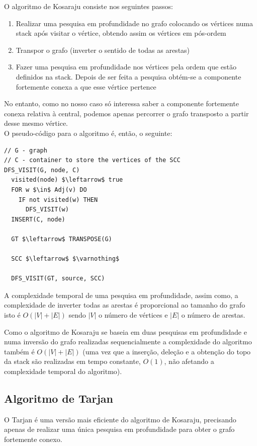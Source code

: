 \documentclass[article, a4paper, 12pt, oneside]{memoir}
\begin{document}
O algoritmo de Kosaraju consiste nos seguintes passos:
\begin{enumerate}
	\item Realizar uma pesquisa em profundidade no grafo colocando os vértices numa stack após visitar o vértice, obtendo assim os vértices em pós-ordem
	\item Transpor o grafo (inverter o sentido de todas as arestas)
	\item Fazer uma pesquisa em profundidade nos vértices pela ordem que estão definidos na stack. Depois de ser feita a pesquisa obtém-se a componente fortemente conexa a que esse vértice pertence
\end{enumerate}

No entanto, como no nosso caso só interessa saber a componente fortemente conexa relativa à central, podemos apenas percorrer o grafo transposto a partir desse mesmo vértice. \\

O pseudo-código para o algoritmo é, então, o seguinte:
\begin{lstlisting}[frame=single, mathescape=true]
// G - graph
// C - container to store the vertices of the SCC
DFS_VISIT(G, node, C)
  visited(node) $\leftarrow$ true
  FOR w $\in$ Adj(v) DO
    IF not visited(w) THEN
      DFS_VISIT(w)
  INSERT(C, node)

  GT $\leftarrow$ TRANSPOSE(G)

  SCC $\leftarrow$ $\varnothing$

  DFS_VISIT(GT, source, SCC)

\end{lstlisting}

A complexidade temporal de uma pesquisa em profundidade, assim como, a complexidade de inverter todas as arestas é proporcional ao tamanho do grafo isto é $O(|V| + |E|)$ sendo $|V|$ o número de vértices e $|E|$ o número de arestas.

Como o algoritmo de Kosaraju se baseia em duas pesquisas em profundidade e numa inversão do grafo realizadas sequencialmente a complexidade do algoritmo também é $O(|V| + |E|)$ (uma vez que a inserção, deleção e a obtenção do topo da stack são realizadas em tempo constante, $O(1)$, não afetando a complexidade temporal do algoritmo).

\subsection{Algoritmo de Tarjan}

O Tarjan é uma versão mais eficiente do algoritmo de Kosaraju, precisando apenas de realizar uma única pesquisa em profundidade para obter o grafo fortemente conexo.
\end{document}
